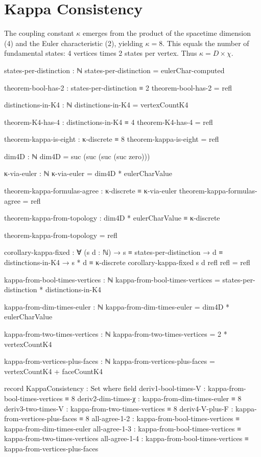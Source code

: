 \documentclass[11pt,a4paper]{book}
\begin{document}
\section{Kappa Consistency}

The coupling constant $\kappa$ emerges from the product of the spacetime dimension (4) and the Euler characteristic (2), yielding $\kappa = 8$. This equals the number of fundamental states: 4 vertices times 2 states per vertex. Thus $\kappa = D \times \chi$.

\begin{code}
states-per-distinction : ℕ
states-per-distinction = eulerChar-computed

theorem-bool-has-2 : states-per-distinction ≡ 2
theorem-bool-has-2 = refl

distinctions-in-K4 : ℕ
distinctions-in-K4 = vertexCountK4

theorem-K4-has-4 : distinctions-in-K4 ≡ 4
theorem-K4-has-4 = refl

theorem-kappa-is-eight : κ-discrete ≡ 8
theorem-kappa-is-eight = refl

dim4D : ℕ  
dim4D = suc (suc (suc (suc zero)))

κ-via-euler : ℕ
κ-via-euler = dim4D * eulerCharValue

theorem-kappa-formulas-agree : κ-discrete ≡ κ-via-euler
theorem-kappa-formulas-agree = refl

theorem-kappa-from-topology : dim4D * eulerCharValue ≡ κ-discrete
\end{code}
\begin{code}
theorem-kappa-from-topology = refl

corollary-kappa-fixed : ∀ (s d : ℕ) → 
  s ≡ states-per-distinction → d ≡ distinctions-in-K4 → s * d ≡ κ-discrete
corollary-kappa-fixed s d refl refl = refl

kappa-from-bool-times-vertices : ℕ
kappa-from-bool-times-vertices = states-per-distinction * distinctions-in-K4
\end{code}

\begin{code}
kappa-from-dim-times-euler : ℕ
kappa-from-dim-times-euler = dim4D * eulerCharValue

kappa-from-two-times-vertices : ℕ
kappa-from-two-times-vertices = 2 * vertexCountK4

kappa-from-vertices-plus-faces : ℕ
kappa-from-vertices-plus-faces = vertexCountK4 + faceCountK4

record KappaConsistency : Set where
  field
    deriv1-bool-times-V  : kappa-from-bool-times-vertices ≡ 8
    deriv2-dim-times-χ   : kappa-from-dim-times-euler ≡ 8
    deriv3-two-times-V   : kappa-from-two-times-vertices ≡ 8
    deriv4-V-plus-F      : kappa-from-vertices-plus-faces ≡ 8
    all-agree-1-2        : kappa-from-bool-times-vertices ≡ kappa-from-dim-times-euler
    all-agree-1-3        : kappa-from-bool-times-vertices ≡ kappa-from-two-times-vertices
    all-agree-1-4        : kappa-from-bool-times-vertices ≡ kappa-from-vertices-plus-faces
\end{code}
\end{document}
